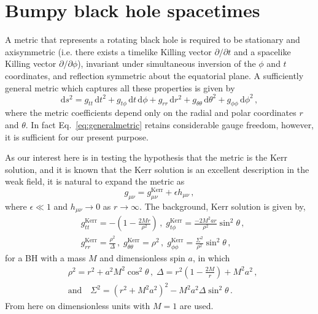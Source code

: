 \section{Bumpy black hole spacetimes}\label{sec:spacetimes}
A metric that represents a rotating black hole is required to be stationary and axisymmetric (i.e. there exists a timelike Killing vector $\partial/\partial t$ and a spacelike Killing vector $\partial/\partial\phi$), invariant under simultaneous inversion of the $\phi$ and $t$ coordinates, and reflection symmetric about the equatorial plane. A sufficiently general metric which captures all these properties is given by \citep{Chandrasekhar:579245}
\begin{equation}\label{eq:generalmetric} \textrm{d}s^{2}=g_{tt}\,\textrm{d}t^{2} + g_{t\phi}\,\textrm{d}t\,\textrm{d}\phi + g_{rr}\,\textrm{d}r^{2} + g_{\theta\theta}\,\textrm{d}\theta^{2} + g_{\phi\phi}\,\textrm{d}\phi^{2}\, , \end{equation}
where the metric coefficients depend only on the radial and polar coordinates $r$ and $\theta$. In fact Eq.\ \ref{eq:generalmetric} retains considerable gauge freedom, however, it is sufficient for our present purpose. 

As our interest here is in testing the hypothesis that the metric is the Kerr solution, and it is known that the Kerr solution is an excellent description in the weak field, it is natural to expand the metric as
\begin{equation} g_{\mu \nu}=g^{\textrm{Kerr}}_{\mu \nu}+\epsilon h_{\mu \nu} \, ,\end{equation}
where $\epsilon \ll 1$ and $h_{\mu\nu}\rightarrow 0$ as $r\rightarrow\infty$. The background,  Kerr solution is given by,
\begin{eqnarray} &g^{\textrm{Kerr}}_{tt}=-\left( 1-\frac{2Mr}{\rho^{2}} \right)\, , \;  g^{\textrm{Kerr}}_{t\phi}=\frac{-2M^{2}ar}{\rho^{2}}\sin ^{2} \theta \, ,\nonumber \\
&g^{\textrm{Kerr}}_{rr}=\frac{\rho^{2}}{\Delta}\, , \; g^{\textrm{Kerr}}_{\theta \theta}=\rho^{2} \, , \; g^{\textrm{Kerr}}_{\phi \phi}=\frac{\Sigma^{2}}{\rho^{2}}\sin ^{2} \theta \, , \end{eqnarray}
for a BH with a mass $M$ and dimensionless spin $a$, in which
\begin{eqnarray} &\rho^{2}=r^{2}+a^{2}M^{2}\cos ^{2} \theta \, , \; \Delta = r^{2}\left( 1-\frac{2M}{r} \right) +M^{2}a^{2} \, ,\\
&\textrm{and}\quad \Sigma^{2} = \left( r^{2}+M^{2}a^{2} \right)^{2} - M^{2}a^{2}\Delta \sin ^{2} \theta \, \nonumber .\end{eqnarray}
From here on dimensionless units with $M=1$ are used.

